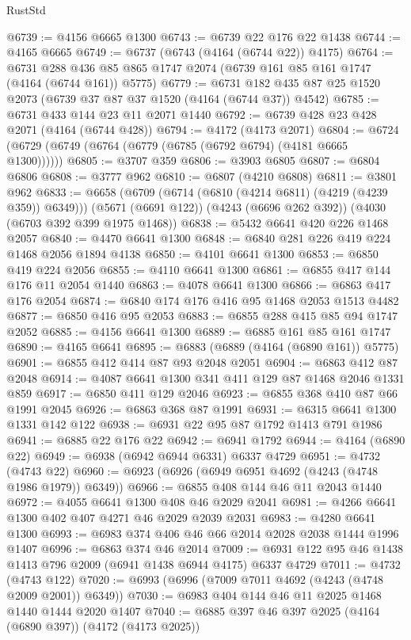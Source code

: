 \begin{lexlean}{RustStd}
\begin{coremodule}
@6739 := @4156 @6665 @1300
@6743 := @6739 @22 @176 @22 @1438
@6744 := @4165 @6665
@6749 := @6737 (@6743 (@4164 (@6744 @22)) @4175)
@6764 := @6731 @288 @436 @85 @865 @1747 @2074 (@6739 @161 @85 @161 @1747 (@4164 (@6744 @161)) @5775)
@6779 := @6731 @182 @435 @87 @25 @1520 @2073 (@6739 @37 @87 @37 @1520 (@4164 (@6744 @37)) @4542)
@6785 := @6731 @433 @144 @23 @11 @2071 @1440
@6792 := @6739 @428 @23 @428 @2071 (@4164 (@6744 @428))
@6794 := @4172 (@4173 @2071)
@6804 := @6724 (@6729 (@6749 (@6764 (@6779 (@6785 (@6792 @6794) (@4181 @6665 @1300))))))
@6805 := @3707 @359
@6806 := @3903 @6805
@6807 := @6804 @6806
@6808 := @3777 @962
@6810 := @6807 (@4210 @6808)
@6811 := @3801 @962
@6833 := @6658
    (@6709 (@6714 (@6810 (@4214 @6811) (@4219 (@4239 @359)) @6349)))
    (@5671 (@6691 @122))
    (@4243 (@6696 @262 @392))
    (@4030 (@6703 @392 @399 @1975 @1468))
@6838 := @5432 @6641 @420 @226 @1468 @2057
@6840 := @4470 @6641 @1300
@6848 := @6840 @281 @226 @419 @224 @1468 @2056 @1894 @4138
@6850 := @4101 @6641 @1300
@6853 := @6850 @419 @224 @2056
@6855 := @4110 @6641 @1300
@6861 := @6855 @417 @144 @176 @11 @2054 @1440
@6863 := @4078 @6641 @1300
@6866 := @6863 @417 @176 @2054
@6874 := @6840 @174 @176 @416 @95 @1468 @2053 @1513 @4482
@6877 := @6850 @416 @95 @2053
@6883 := @6855 @288 @415 @85 @94 @1747 @2052
@6885 := @4156 @6641 @1300
@6889 := @6885 @161 @85 @161 @1747
@6890 := @4165 @6641
@6895 := @6883 (@6889 (@4164 (@6890 @161)) @5775)
@6901 := @6855 @412 @414 @87 @93 @2048 @2051
@6904 := @6863 @412 @87 @2048
@6914 := @4087 @6641 @1300 @341 @411 @129 @87 @1468 @2046 @1331 @859
@6917 := @6850 @411 @129 @2046
@6923 := @6855 @368 @410 @87 @66 @1991 @2045
@6926 := @6863 @368 @87 @1991
@6931 := @6315 @6641 @1300 @1331 @142 @122
@6938 := @6931 @22 @95 @87 @1792 @1413 @791 @1986
@6941 := @6885 @22 @176 @22
@6942 := @6941 @1792
@6944 := @4164 (@6890 @22)
@6949 := @6938 (@6942 @6944 @6331) @6337 @4729
@6951 := @4732 (@4743 @22)
@6960 := @6923 (@6926 (@6949 @6951 @4692 (@4243 (@4748 @1986 @1979)) @6349))
@6966 := @6855 @408 @144 @46 @11 @2043 @1440
@6972 := @4055 @6641 @1300 @408 @46 @2029 @2041
@6981 := @4266 @6641 @1300 @402 @407 @4271 @46 @2029 @2039 @2031
@6983 := @4280 @6641 @1300
@6993 := @6983 @374 @406 @46 @66 @2014 @2028 @2038 @1444 @1996 @1407
@6996 := @6863 @374 @46 @2014
@7009 := @6931 @122 @95 @46 @1438 @1413 @796 @2009 (@6941 @1438 @6944 @4175) @6337 @4729
@7011 := @4732 (@4743 @122)
@7020 := @6993 (@6996 (@7009 @7011 @4692 (@4243 (@4748 @2009 @2001)) @6349))
@7030 := @6983 @404 @144 @46 @11 @2025 @1468 @1440 @1444 @2020 @1407
@7040 := @6885 @397 @46 @397 @2025 (@4164 (@6890 @397)) (@4172 (@4173 @2025))

\end{coremodule}
\end{lexlean}
